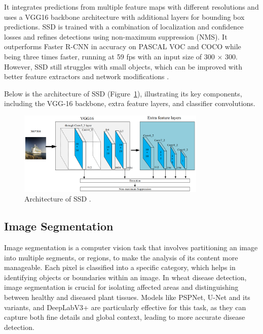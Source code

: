 It integrates predictions from multiple feature maps with different resolutions and uses a VGG16 backbone architecture with additional layers for bounding box predictions. SSD is trained with a combination of localization and confidence losses and refines detections using non-maximum suppression (NMS). It outperforms Faster R-CNN in accuracy on PASCAL VOC and COCO while being three times faster, running at 59 fps with an input size of 300 × 300. However, SSD still struggles with small objects, which can be improved with better feature extractors and network modifications \parencite{zhao2019objectdetection}.

Below is the architecture of SSD (Figure~\ref{fig:figure19}), illustrating its key components, including the VGG-16 backbone, extra feature layers, and classifier convolutions.

\begin{figure}[H] %
    \centering
    \includegraphics[width=0.8\textwidth]{chapters/chapter1/images/Figure19.png}
    \caption{Architecture of SSD \parencite{li2021water}.}
    \label{fig:figure19}
\end{figure}

\subsection{Image Segmentation}
Image segmentation is a computer vision task that involves partitioning an image into multiple segments, or regions, to make the analysis of its content more manageable. Each pixel is classified into a specific category, which helps in identifying objects or boundaries within an image. In wheat disease detection, image segmentation is crucial for isolating affected areas and distinguishing between healthy and diseased plant tissues. Models like PSPNet, U-Net and its variants, and DeepLabV3+ are particularly effective for this task, as they can capture both fine details and global context, leading to more accurate disease detection.

